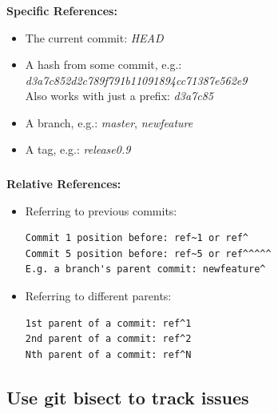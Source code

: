 
\begin{frame}[fragile]
  \frametitle{\insertsubsection}

  \textbf{Specific References:}\vspacing
  \begin{itemize}
    \item The current commit: \textit{HEAD}
    \item A hash from some commit, e.g.:\\
      \textit{d3a7c852d2c789f791b11091894cc71387e562e9}\\
      Also works with just a prefix: \textit{d3a7c85}
    \item A branch, e.g.: \textit{master}, \textit{newfeature}
    \item A tag, e.g.: \textit{release0.9}
  \end{itemize}
\end{frame}

\begin{frame}[fragile]
  \frametitle{\insertsubsection}

  \textbf{Relative References:}\vspacing
  \begin{itemize}
    \item Referring to previous commits:\\
\begin{verbatim}
Commit 1 position before: ref~1 or ref^
Commit 5 position before: ref~5 or ref^^^^^
E.g. a branch's parent commit: newfeature^
\end{verbatim}

    \item Referring to different parents:\\
\begin{verbatim}
1st parent of a commit: ref^1
2nd parent of a commit: ref^2
Nth parent of a commit: ref^N
\end{verbatim}
  \end{itemize}

\end{frame}


\subsection{Use git bisect to track issues}

\begin{frame}
  \begin{center}
    \textbf{\Huge{\insertsubsection}}
  \end{center}
\end{frame}

